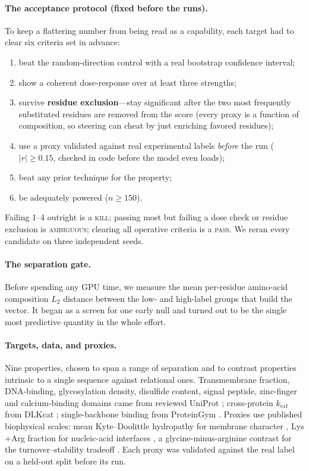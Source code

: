 \documentclass[11pt]{article}
\begin{document}
\paragraph{The acceptance protocol (fixed before the runs).}
To keep a flattering number from being read as a capability, each target had to
clear six criteria set in advance:
\begin{enumerate}\itemsep2pt
\item beat the random-direction control with a real bootstrap confidence
interval;
\item show a coherent dose-response over at least three strengths;
\item survive \textbf{residue exclusion}---stay significant after the two most
frequently substituted residues are removed from the score (every proxy is a
function of composition, so steering can cheat by just enriching favored
residues);
\item use a proxy validated against real experimental labels \emph{before} the
run ($|r|\ge0.15$, checked in code before the model even loads);
\item beat any prior technique for the property;
\item be adequately powered ($n\ge150$).
\end{enumerate}
Failing 1--4 outright is a \textsc{kill}; passing most but failing a dose check
or residue exclusion is \textsc{ambiguous}; clearing all operative criteria is
a \textsc{pass}. We reran every candidate on three independent seeds.

\paragraph{The separation gate.}
Before spending any GPU time, we measure the mean per-residue amino-acid
composition $L_2$ distance between the low- and high-label groups that build the
vector. It began as a screen for one early null and turned out to be the single
most predictive quantity in the whole effort.

\paragraph{Targets, data, and proxies.}
Nine properties, chosen to span a range of separation and to contrast
properties intrinsic to a single sequence against relational ones. Transmembrane
fraction, DNA-binding, glycosylation density, disulfide content, signal peptide,
zinc-finger and calcium-binding domains came from reviewed UniProt
\citep{uniprot2023}; cross-protein $k_{\mathrm{cat}}$ from DLKcat
\citep{li2022dlkcat}; single-backbone binding from ProteinGym
\citep{notin2023proteingym}. Proxies use published biophysical scales: mean
Kyte--Doolittle hydropathy for membrane character \citep{kyte1982hydropathy},
Lys$+$Arg fraction for nucleic-acid interfaces \citep{luscombe2001dna}, a
glycine-minus-arginine contrast for the turnover--stability tradeoff
\citep{siddiqui2006cold}. Each proxy was validated against the real label on a
held-out split before its run.
\end{document}
